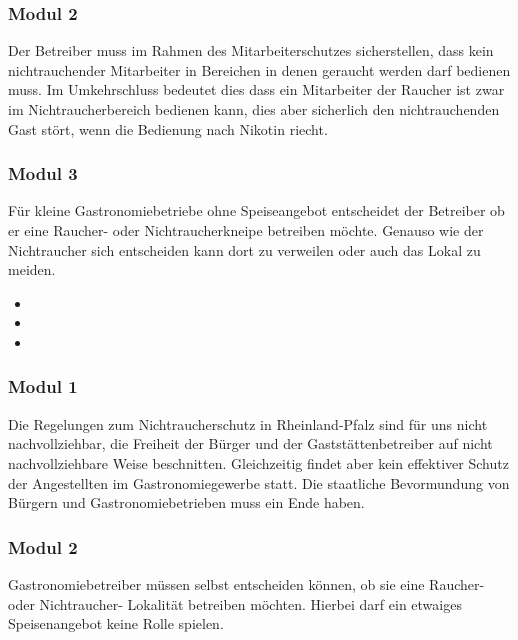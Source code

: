 \subsubsection{Modul 2}
\abstimmung
Der Betreiber muss im Rahmen des Mitarbeiterschutzes sicherstellen, dass kein nichtrauchender Mitarbeiter in Bereichen in denen geraucht werden darf bedienen muss. Im Umkehrschluss bedeutet dies dass ein Mitarbeiter der Raucher ist zwar im Nichtraucherbereich bedienen kann, dies aber sicherlich den nichtrauchenden Gast stört, wenn die Bedienung nach Nikotin riecht.

\subsubsection{Modul 3}
\abstimmung
Für kleine Gastronomiebetriebe ohne Speiseangebot entscheidet der Betreiber ob er eine Raucher- oder Nichtraucherkneipe betreiben möchte. Genauso wie der Nichtraucher sich entscheiden kann dort zu verweilen oder auch das Lokal zu meiden.
 
\label{wp:selbst:raucher3}
\begin{itemize}
\item {}
\item {}
\item {}
\end{itemize}

\subsubsection{Modul 1}
\abstimmung
Die Regelungen zum Nichtraucherschutz in Rheinland-Pfalz sind für uns nicht nachvollziehbar, die Freiheit der Bürger und der Gaststättenbetreiber auf nicht nachvollziehbare Weise beschnitten. Gleichzeitig findet aber kein effektiver Schutz der Angestellten im Gastronomiegewerbe statt. Die staatliche Bevormundung von Bürgern und Gastronomiebetrieben muss ein Ende haben.

\subsubsection{Modul 2}
\abstimmung
Gastronomiebetreiber müssen selbst entscheiden können, ob sie eine Raucher- oder Nichtraucher- Lokalität betreiben möchten. Hierbei darf ein etwaiges Speisenangebot keine Rolle spielen.

